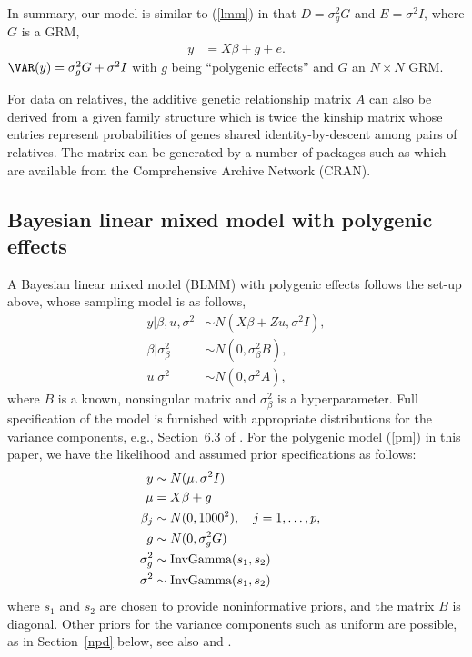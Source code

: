 \documentclass[article]{jss}
\begin{document}
In summary, our model is similar to (\ref{lmm}) in that $D = \sigma_g^2G$
and $E = \sigma^2I$, where $G$ is a GRM, 
\begin{align}
y & =  X\beta + g + e.\label{pm} 
\end{align}
$\VAR(y) = \sigma_g^2G+\sigma^2I$ with $g$ being ``polygenic effects'' and
$G$ an $N\times N$ GRM.

For data on relatives, the additive genetic relationship matrix $A$
can also be derived from a given family structure which is twice the
kinship matrix \citep{lange02} whose entries represent probabilities
of genes shared identity-by-descent among pairs of relatives. The
matrix can be generated by a number of  packages such as
 \citep{kinship2} which are available from the
Comprehensive  Archive Network (CRAN).

\subsection{Bayesian linear mixed model with polygenic effects}\label{blmm}
A Bayesian linear mixed model (BLMM) with polygenic effects follows the set-up above, 
whose sampling model is as follows,
\begin{align}
y|\beta, u, \sigma^2 &\sim  N(X\beta+Zu, \sigma^2I),\nonumber\\
\beta|\sigma_\beta^2&\sim  N(0,\sigma_\beta^2B), \nonumber\\
u|\sigma^2 &\sim N(0,\sigma^2A),
\label{blmmp}
\end{align}
where $B$ is a known, nonsingular matrix and $\sigma_\beta^2$ is a 
hyperparameter. Full specification of the model is furnished with 
appropriate distributions for the variance components, e.g., Section~6.3
of \cite{sorensen02}. For the polygenic model (\ref{pm}) in this paper,
we have the likelihood and assumed prior specifications as follows:
\begin{align}
 y & \sim   N(\mu, \sigma^2I) \cr
 \mu & =  X\beta + g \cr
 \beta_j & \sim  N(0, 1000^2),\quad j=1,\ldots,p \label{blmms}, \cr
 g & \sim  N(0,\sigma_g^2G) \cr
 \sigma_g^2 & \sim \text{InvGamma}(s_1, s_2) \cr
 \sigma^2 & \sim \text{InvGamma}(s_1, s_2)
\end{align}
where $s_1$ and $s_2$ are chosen to provide noninformative priors, and the
matrix $B$ is diagonal.
Other priors for the variance components such as uniform are possible, 
as in Section~\ref{npd} below, see also \cite{waldmann09} and \cite{gelman06}.
\end{document}
